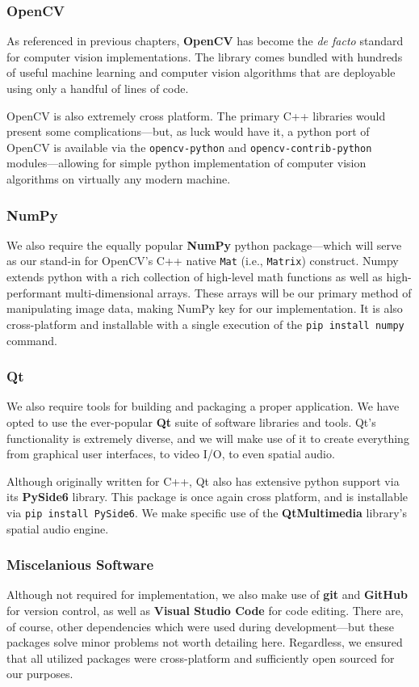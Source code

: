 \documentclass{report}
\newcommand{\tech}[1]{\textbf{#1}}
\begin{document}
\subsubsection{OpenCV}
As referenced in previous chapters, \tech{OpenCV} has become the \emph{de facto} standard for computer vision implementations. The library comes bundled with hundreds of useful machine learning and computer vision algorithms that are deployable using only a handful of lines of code.

OpenCV is also extremely cross platform. The primary C++ libraries would present some complications---but, as luck would have it, a python port of OpenCV is available via the \texttt{opencv-python} and \texttt{opencv-contrib-python} modules---allowing for simple python implementation of computer vision algorithms on virtually any modern machine. 

\subsubsection{NumPy}
We also require the equally popular \tech{NumPy} python package---which will serve as our stand-in for OpenCV's C++ native \texttt{Mat} (i.e., \texttt{Matrix}) construct. Numpy extends python with a rich collection of high-level math functions as well as high-performant multi-dimensional arrays. These arrays will be our primary method of manipulating image data, making NumPy key for our implementation. It is also cross-platform and installable with a single execution of the \texttt{pip install numpy} command.

\subsubsection{Qt}
We also require tools for building and packaging a proper application. We have opted to use the ever-popular \tech{Qt} suite of software libraries and tools. Qt's functionality is extremely diverse, and we will make use of it to create everything from graphical user interfaces, to video I/O, to even spatial audio.

Although originally written for C++, Qt also has extensive python support via its \tech{PySide6} library. This package is once again cross platform, and is installable via \texttt{pip install PySide6}. We make specific use of the \tech{QtMultimedia} library's spatial audio engine.

\subsubsection{Miscelanious Software}
Although not required for implementation, we also make use of \tech{git} and \tech{GitHub} for version control, as well as \tech{Visual Studio Code} for code editing. There are, of course, other dependencies which were used during development---but these packages solve minor problems not worth detailing here. Regardless, we ensured that all utilized packages were cross-platform and sufficiently open sourced for our purposes. 
\end{document}
